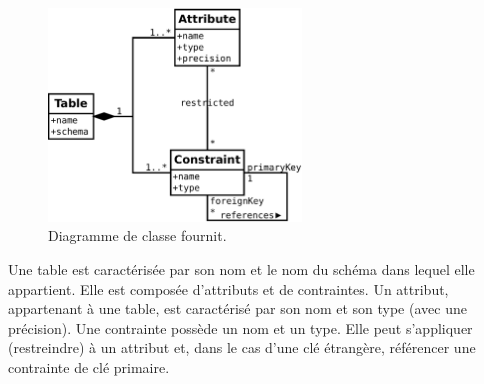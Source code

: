 \begin{figure}[H]
\centering
\includegraphics[width=0.6\textwidth]{files/diag_class_origine}
\caption{Diagramme de classe fournit.}
\label{figure:diag_classe_fournit}
\end{figure}

Une table est caractérisée par son nom et le nom du schéma dans lequel elle appartient. Elle est composée d'attributs et de contraintes. Un attribut, appartenant à une table, est caractérisé par son nom et son type (avec une précision). Une contrainte possède un nom et un type. Elle peut s'appliquer (restreindre) à un attribut et, dans le cas d'une clé étrangère, référencer une contrainte de clé primaire.
